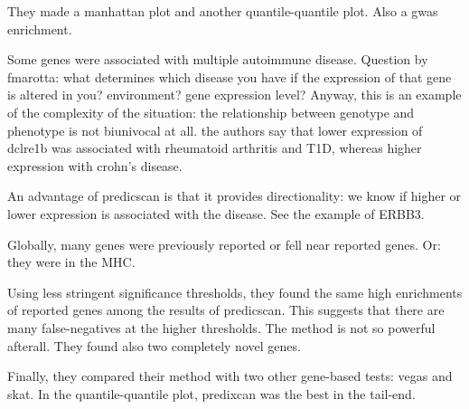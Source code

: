 \documentclass[../main.tex]{subfiles}
\begin{document}
They made a manhattan plot and another quantile-quantile plot. Also a 
gwas enrichment.

Some genes were associated with multiple autoimmune disease. Question by 
fmarotta: what determines which disease you have if the expression of 
that gene is altered in you? environment? gene expression level? Anyway, 
this is an example of the complexity of the situation: the relationship 
between genotype and phenotype is not biunivocal at all. the authors say 
that lower expression of dclre1b was associated with rheumatoid 
arthritis and T1D, whereas higher expression with crohn's disease.

An advantage of predicscan is that it provides directionality: we know 
if higher or lower expression is associated with the disease. See the 
example of ERBB3.

Globally, many genes were previously reported or fell near reported 
genes. Or: they were in the MHC.

Using less stringent significance thresholds, they found the same high 
enrichments of reported genes among the results of predicscan. This 
suggests that there are many false-negatives at the higher thresholds. 
The method is not so powerful afterall. They found also two completely 
novel genes.

Finally, they compared their method with two other gene-based tests: 
vegas and skat. In the quantile-quantile plot, predixcan was the best in 
the tail-end.
\end{document}
